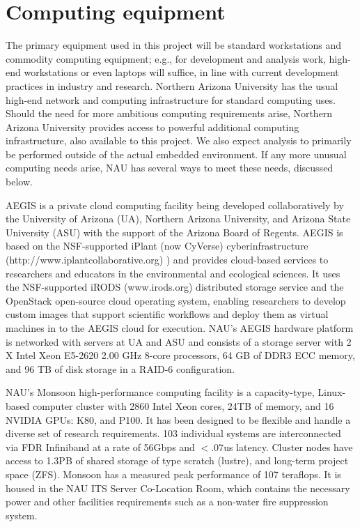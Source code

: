 \documentclass[12pt]{article}
\begin{document}
\begin{center}
{\large\sf\textbf{\proptitle}}
\end{center}

\section*{Computing equipment}

The primary equipment used in this project will be standard workstations and commodity computing equipment; e.g., for development and analysis work, high-end workstations or even laptops will suffice, in line with current development practices in industry and research. Northern Arizona University has the usual high-end network and computing infrastructure for standard computing uses.  Should the need for more ambitious computing requirements arise, Northern Arizona University provides access to powerful additional computing infrastructure, also available to this project.  We also expect analysis to primarily be performed outside of the actual embedded environment.  If any more unusual computing needs arise, NAU has several ways to meet these needs, discussed below.

AEGIS is a private cloud computing facility being developed collaboratively by the University of Arizona (UA), Northern Arizona University, and Arizona State University (ASU) with the support of the Arizona Board of Regents. AEGIS is based on the NSF-supported iPlant (now CyVerse) cyberinfrastructure (http://www.iplantcollaborative.org) ) and provides cloud-based services to researchers and educators in the environmental and ecological sciences. It uses the NSF-supported iRODS (www.irods.org) distributed storage service and the OpenStack open-source cloud operating system, enabling researchers to develop custom images that support scientific workflows and deploy them as virtual machines in to the AEGIS cloud for execution. NAU’s AEGIS hardware platform is networked with servers at UA and ASU and consists of a storage server with 2 X Intel Xeon E5-2620 2.00 GHz 8-core processors, 64 GB of DDR3 ECC memory, and 96 TB of disk storage in a RAID-6 configuration.

NAU’s Monsoon high-performance computing facility is a capacity-type, Linux-based computer cluster with 2860 Intel Xeon cores, 24TB of memory, and 16 NVIDIA GPUs: K80, and P100. It has been designed to be flexible and handle a diverse set of research requirements. 103 individual systems are interconnected via FDR Infiniband at a rate of 56Gbps and $<.07$us latency. Cluster nodes have access to 1.3PB of shared storage of type scratch (lustre), and long-term project space (ZFS). Monsoon has a measured peak performance of 107 teraflops. It is housed in the NAU ITS Server Co-Location Room, which contains the necessary power and other facilities requirements such as a non-water fire suppression system.
\end{document}
